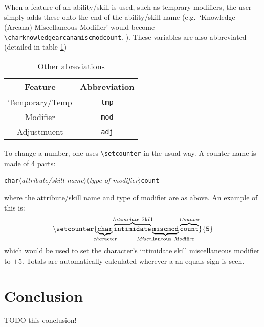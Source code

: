 \documentclass[oneside]{article}
\begin{document}
When a feature of an ability/skill is used, such as temprary modifiers, the user simply adds these onto the end of the ability/skill name (e.g.\ `Knowledge (Arcana) Miscellaneous Modifier' would become \verb=\charknowledgearcanamiscmodcount=. ). These variables are also abbreviated (detailed in table \ref{tab:otherabbrev})

\begin{table}[h]
  \centering
  \begin{tabular}{c c }
    Feature & Abbreviation \\\hline
    Temporary/Temp & \verb=tmp=\\
    Modifier & \verb=mod=\\
    Adjustmuent & \verb=adj=\\\hline
  \end{tabular}
  \caption{Other abreviations}
  \label{tab:otherabbrev}
\end{table}

To change a number, one uses \verb=\setcounter= in the usual way. A counter name is made of 4 parts:
\protect\parbox{\linewidth}{\texttt{char}$\langle$\emph{attribute/skill name}$\rangle\langle$\emph{type of modifier}$\rangle$\texttt{count}}
where the attribute/skill name and type of modifier are as above. An example of this is:
\[
\mathtt{\backslash setcounter\{\underbrace{\mathtt{char}}_{\mathclap{\mathrm{\emph{char}acter}}}\overbrace{\mathtt{intimidate}}^{\mathclap{\mathrm{\emph{Intimidate}\ Skill}}}\underbrace{\mathtt{miscmod}}_{\mathclap{\mathrm{\emph{Misc}ellaneous\ \emph{Mod}ifier}}}\overbrace{\mathtt{count}}^{\mathclap{\mathrm{\emph{Count}er}}}\}\{5\}}
\]
which would be used to set the character's intimidate skill miscellaneous modifier to $+5$. Totals are automatically calculated wherever a an equals sign is seen.

\section{Conclusion}
\label{sec:conclusion}

TODO this conclusion!
\end{document}
